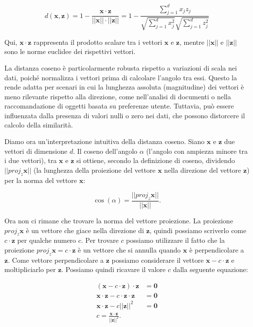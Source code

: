     \[
d(\mathbf{x}, \mathbf{z}) = 1 - \frac{\mathbf{x} \cdot \mathbf{z}}{||\mathbf{x}|| \cdot ||\mathbf{z}||} = 1 - \frac{\sum_{j=1}^d x_j z_j}{\sqrt{\sum_{j=1}^d x_j^2} \sqrt{\sum_{j=1}^d z_j^2}}
\]

Qui, $\mathbf{x} \cdot \mathbf{z}$ rappresenta il prodotto scalare tra i 
vettori $\mathbf{x}$ e $\mathbf{z}$, mentre $||\mathbf{x}||$ e $||\mathbf{z}||$ sono 
le norme euclidee dei rispettivi vettori.

La distanza coseno è particolarmente robusta rispetto a variazioni di scala nei dati, 
poiché normalizza i vettori prima di calcolare l'angolo tra essi. Questo la rende adatta 
per scenari in cui la lunghezza assoluta (magnitudine) dei vettori è meno rilevante 
rispetto alla direzione, come nell'analisi di 
documenti o nella raccomandazione di oggetti basata su preferenze utente. Tuttavia, può essere 
influenzata dalla presenza di valori nulli o zero nei dati, che possono distorcere il calcolo della similarità.

Diamo ora un'interpretazione intuitiva della distanza coseno. Siano $\mathbf x$ e $\mathbf z$ 
due vettori di dimensione $d$. Il coseno dell'angolo $\alpha$ (l'angolo con ampiezza minore tra i due vettori),
tra $\mathbf x$ e $\mathbf z$ si ottiene, secondo la definizione di coseno, dividendo $||proj_z \mathbf x||$ 
(la lunghezza della 
proiezione del vettore $\mathbf x$ nella direzione del vettore $\mathbf z$) per la norma del vettore $\mathbf x$:

\begin{equation}
\cos(\alpha) = \frac{||proj_z \mathbf x||}{||\mathbf x||}.
\label{eq:cosine}
\end{equation}

Ora non ci rimane che trovare la norma del vettore proiezione. La proiezione $proj_z \mathbf x$ è
un vettore che giace nella direzione di $\mathbf z$, quindi possiamo scriverlo come
$c \cdot \mathbf z$ per qualche numero $c$. Per trovare $c$ possiamo utilizzare il fatto che la 
proiezione $proj_z \mathbf x = c \cdot \mathbf z$ è un vettore che si annulla quando $\mathbf x$ è perpendicolare
a $\mathbf z$. Come vettore perpendicolare a $\mathbf z$ possiamo considerare il vettore $\mathbf x - c \cdot \mathbf z$ 
e moltipliciarlo per $\mathbf z$. Possiamo quindi ricavare il valore $c$ dalla seguente equazione:

\begin{align}
(\mathbf x - c \cdot \mathbf z) \cdot \mathbf z &= \mathbf 0\\
\mathbf x \cdot \mathbf z - c \cdot \mathbf z \cdot \mathbf z &=\mathbf 0\\
\mathbf x \cdot \mathbf z - c ||\mathbf z||^2 &= \mathbf 0\\
c = \frac{\mathbf x \cdot \mathbf z}{||\mathbf z||^2}.
\label{eq:projection}
\end{align}

